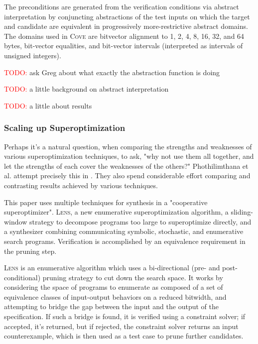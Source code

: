 \documentclass[12pt,twoside]{reedthesis}
\newcommand{\red}[1]{\textcolor{red}{#1}}
\begin{document}
The preconditions are generated from the verification conditions via abstract interpretation by conjuncting abstractions of the test inputs on which the target and candidate are equivalent in progressively more-restrictive abstract domains. The domains used in \textsc{Cove} are bitvector alignment to 1, 2, 4, 8, 16, 32, and 64 bytes, bit-vector equalities, and bit-vector intervals (interpreted as intervals of unsigned integers).
    
\red{TODO:} ask Greg about what exactly the abstraction function is doing

\red{TODO:} a little background on abstract interpretation

\red{TODO:} a little about results

\subsubsection{Scaling up Superoptimization}


Perhaps it's a natural question, when comparing the strengths and weaknesses of various superoptimization techniques, to ask, "why not use them all together, and let the strengths of each cover the weaknesses of the others?"
Phothilimthana et al. attempt precisely this in \cite{phothilimthana2016scaling}.
They also spend considerable effort comparing and contrasting results achieved by various techniques.
    
This paper uses multiple techniques for synthesis in a "cooperative superoptimizer".
\textsc{Lens}, a new enumerative superoptimization algorithm,
a sliding-window strategy to decompose programs too large to superoptimize directly,
and a synthesizer combining communicating symbolic, stochastic, and enumerative search programs.
Verification is accomplished by an equivalence requirement in the pruning step.
    
\textsc{Lens} is an enumerative algorithm which uses a bi-directional (pre- and post-conditional) pruning strategy to cut down the search space.
It works by considering the space of programs to enumerate as composed of a set of equivalence classes of input-output behaviors on a reduced bitwidth, and attempting to bridge the gap between the input and the output of the specification.
If such a bridge is found, it is verified using a constraint solver; if accepted, it's returned, but if rejected, the constraint solver returns an input counterexample, which is then used as a test case to prune further candidates.
\end{document}
